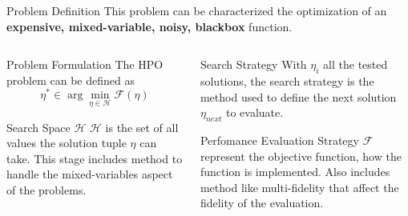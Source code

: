 \begin{frame}{Problem Definition}
    This problem can be characterized the optimization of an \large\textbf{expensive, mixed-variable, noisy, blackbox} function.

    \begin{columns}
    
        \begin{column}[t]{0.5\textwidth}
        \begin{block}{Problem Formulation}
            The HPO problem can be defined as 
            \begin{equation}
               \eta^* \in \arg\min_{\eta \in \mathcal{H}} \mathcal{F}(\eta) 
            \end{equation}

        \end{block}

        \begin{block}{Search Space $\mathcal{H}$}
            $\mathcal{H}$ is the set of all values the solution tuple $\eta$ can take. This stage includes method to handle the mixed-variables aspect of the problems.   
        \end{block}
        \end{column}
        
        \begin{column}[t]{0.5\textwidth}

    
        \begin{block}{Search Strategy}
            With $\eta_i$ all the tested solutions, the search strategy is the method used to define the next solution $\eta_{next}$ to evaluate. 
        \end{block}

        \begin{block}{Perfomance Evaluation Strategy}
            $\mathcal{F}$ represent the objective function, how the function is implemented. Also includes method like multi-fidelity that affect the fidelity of the evaluation.
        \end{block}

        \end{column}
         
  \end{columns}
\end{frame}


